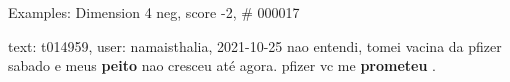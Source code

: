 \begin{frame}{Examples: Dimension 4 neg, score -2, \# 000017}
\footnotesize
\begin{alertblock}{text: t014959, user: namaisthalia, 2021-10-25}
nao entendi, tomei vacina da pfizer sabado e meus \textbf{peito} nao cresceu 
até agora. pfizer vc me \textbf{prometeu} . 
\end{alertblock}
\end{frame}

